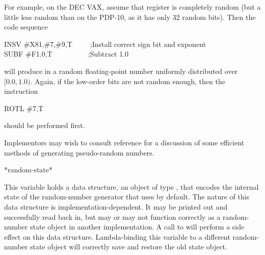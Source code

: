 \begin{defun}[Function]
\begin{implementation}
For example, on the DEC VAX, assume that register  is
completely random (but a little less random than on the PDP-10, as
it has only 32 random bits).  Then the code sequence
\begin{lisp}
INSV \#{\Xcircumflex}X81,\#7,\#9,T~~~~~;{\rm Install correct sign bit and exponent} \\
SUBF \#{\Xcircumflex}F1.0,T~~~~~~~~~~;{\rm Subtract 1.0}
\end{lisp}
will produce in  a random floating-point number uniformly distributed
over $[0.0, 1.0)$.  Again, if the low-order bits are not random enough,
then the instruction
\begin{lisp}
ROTL \#7,T
\end{lisp}
should be performed first.

Implementors may wish to consult reference \cite{ADDITIVE-RANDOMS} for
a discussion of some efficient methods of generating pseudo-random numbers.
\end{implementation}
\afternoterule
\end{defun}

\begin{defun}[Variable]
*random-state*

This variable holds a data structure,
an object of type , that encodes the internal state
of the random-number generator that  uses by default.
The nature
of this data structure is implementation-dependent.  It may be
printed out and successfully read back in, but may or may not function
correctly as a random-number state object in another implementation.
A call to  will perform a side effect on this data structure.
Lambda-binding this variable to a different random-number state object
will correctly save and restore the old state object.
\end{defun}

